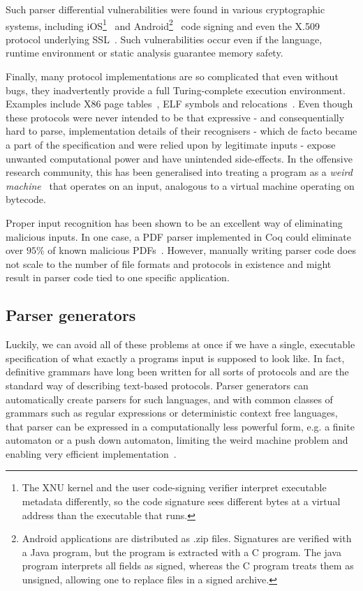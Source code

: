 Such parser differential vulnerabilities were found in various cryptographic systems, including  iOS\footnote{The XNU kernel and the user code-signing verifier interpret executable metadata
  differently, so the code signature sees different bytes at a virtual address than the executable
  that runs.}~\cite{evaders6} and Android\footnote{Android applications are distributed as .zip
  files. Signatures are verified with a Java program, but the program is extracted with a C program.
The java program interprets all fields as signed, whereas the C program treats them as unsigned,
allowing one to replace files in a signed archive.}~\cite{saurik-masterkey} code signing and even the
X.509 protocol underlying SSL~\cite{DBLP:conf/fc/KaminskyPS10}. Such vulnerabilities occur even if the language,
runtime environment or static analysis guarantee memory safety.

Finally, many protocol implementations are so complicated that even without bugs, they inadvertently
provide a full Turing-complete execution environment. Examples include X86 page tables~\cite{bangert2013page}, ELF symbols and relocations~\cite{shapiro2013weird}. Even though these
protocols were never intended to be that expressive - and consequentially hard to parse, implementation details of their
recognisers - which de facto became a part of the specification and were relied upon by legitimate
inputs - expose unwanted computational power and have unintended side-effects.
In the offensive research community, this has
been generalised into treating a program as a \textit{weird machine}~\cite{bratus2011exploit} that
operates on an input, analogous to a virtual machine operating on bytecode.

Proper input recognition has been shown to be an excellent way of eliminating malicious inputs. In
one case, a  PDF parser implemented in Coq could eliminate over $95\%$ of known malicious PDFs~\cite{Bogk-PDF}.
However, manually writing parser code does not scale to the number of file formats  and protocols in
existence and might result in parser code tied to one specific application.


\subsection{Parser generators}
Luckily, we can avoid all of these problems at once if we have a single, executable specification of
what exactly a programs input is supposed to look like. In fact, definitive grammars have long
been written for all sorts of protocols and are the standard way of describing text-based protocols.
Parser generators can automatically create parsers for such languages, and with common classes of
grammars such as regular expressions or deterministic context free languages, that parser can be
expressed in a computationally less powerful form, e.g. a finite automaton or a push down automaton,
limiting the weird machine problem and enabling very efficient implementation~\cite{Knuth1965607}.

